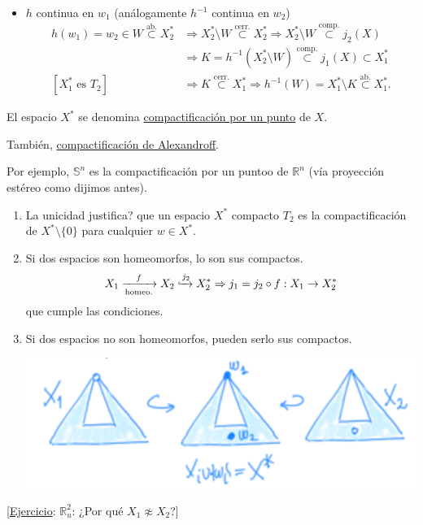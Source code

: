 \begin{demo}
\begin{enumerate}
\begin{itemize}
        \item $h$ continua en $w_1$ (análogamente $h^{-1}$ continua en $w_2$)
        \begin{align*}
            h\left( w_1 \right) = w_2 \in W \stackrel{\text{ab.}}{\subset} X_2^* &\Rightarrow X_2^* \setminus W \stackrel{\text{cerr.}}{\subset} X_2^* \Rightarrow X_2^* \setminus W \stackrel{\text{comp.}}{\subset} j_2\left( X \right)\\
            &\Rightarrow K = h^{-1}\left( X_2^* \setminus W \right) \stackrel{\text{comp.}}{\subset} j_1\left( X \right) \subset X_1^*\\
            \left[ X_1^* \text{ es } T_2 \right] &\Rightarrow K \stackrel{\text{cerr.}}{\subset} X_1^* \Rightarrow h^{-1}\left( W \right) = X_1^* \setminus K \stackrel{\text{ab.}}{\subset} X_1^*
        .\end{align*}
    \end{itemize}
\end{enumerate}
\end{demo}

\begin{defi}
El espacio $X^*$ se denomina \underline{compactificación por un punto} de $X$. 

También, \underline{compactificación de Alexandroff}.
\end{defi}
Por ejemplo, $\mathbb{S}^n$ es la compactificación por un puntoo de $\mathbb{R}^n$ (vía proyección estéreo como dijimos antes).

\begin{obs}[¡Importante!]
\begin{enumerate}
    \item La unicidad justifica? que un espacio $X^*$ compacto $T_2$ es la compactificación de $X^* \setminus \{0\}$ para cualquier $w \in X^*$.

    \item Si dos espacios son homeomorfos, lo son sus compactos.
    \[
        X_1 \xrightarrow[\text{homeo.}]{f} X_2 \xhookrightarrow{j_2} X_2^* \Rightarrow j_1 = j_2 \circ f : X_1 \rightarrow X_2^*
    \]
    que cumple las condiciones.

    \item Si dos espacios no son homeomorfos, pueden serlo sus compactos.
    \begin{center}
        \includegraphics[scale=0.3]{images/obs_comp_pto} 
    \end{center}
\end{enumerate} 
\end{obs}

[\underline{Ejercicio}: $\mathbb{R}_u^2$: ¿Por qué $X_1 \not \approx X_2$?]
